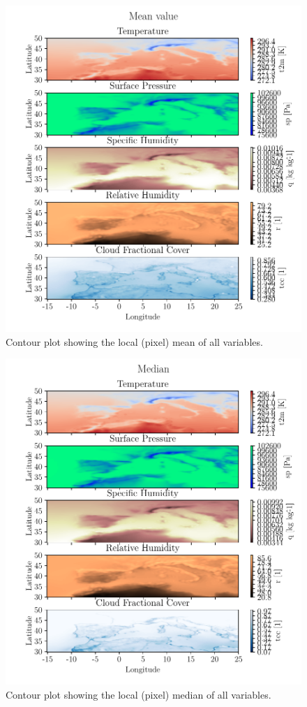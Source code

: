 \begin{figure}[ht]
    \centering
    \includegraphics{python_figs/contourplot_all_variables_mean.pdf}
    \caption{Contour plot showing the local (pixel) mean of all variables.}
    \label{fig:contour_mean_all_vars}
\end{figure}


\begin{figure}[ht]
    \centering
    \includegraphics{python_figs/contourplot_all_variables_median.pdf}
    \caption{Contour plot showing the local (pixel) median of all variables.}
    \label{fig:contour_mean_all_vars}
\end{figure}
